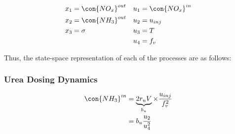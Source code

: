 \begin{align*}
    x_1 &= \con{NO_x}^{out} & u_1 &= \con{NO_x}^{in} \\
    x_2 &= \con{NH_3}^{out} & u_2 &= u_{inj} \\
    x_3 &= \sigma & u_3 &= T\\
        &         & u_4 &= f_v
\end{align*}

Thus, the state-space representation of each of the processes are as follows:

\subsubsection{Urea Dosing Dynamics}
\begin{align*}
    \con{NH_3}^{in} &= \underbrace{2r_u V}_{b_u} \times \frac{u_{inj}}{f_v^2} \\
                    &= b_u \frac{u_2 }{u_4^2 }
\end{align*}




